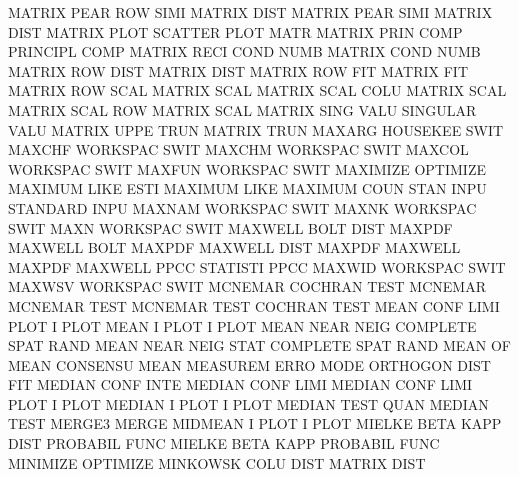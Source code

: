 MATRIX   PEAR ROW  SIMI                 MATRIX   DIST
MATRIX   PEAR SIMI                      MATRIX   DIST
MATRIX   PLOT                           SCATTER  PLOT MATR
MATRIX   PRIN COMP                      PRINCIPL COMP
MATRIX   RECI COND NUMB                 MATRIX   COND NUMB
MATRIX   ROW  DIST                      MATRIX   DIST
MATRIX   ROW  FIT                       MATRIX   FIT
MATRIX   ROW  SCAL                      MATRIX   SCAL
MATRIX   SCAL COLU                      MATRIX   SCAL
MATRIX   SCAL ROW                       MATRIX   SCAL
MATRIX   SING VALU                      SINGULAR VALU
MATRIX   UPPE TRUN                      MATRIX   TRUN
MAXARG                                  HOUSEKEE SWIT
MAXCHF                                  WORKSPAC SWIT
MAXCHM                                  WORKSPAC SWIT
MAXCOL                                  WORKSPAC SWIT
MAXFUN                                  WORKSPAC SWIT
MAXIMIZE                                OPTIMIZE
MAXIMUM  LIKE ESTI                      MAXIMUM  LIKE
MAXIMUM  COUN STAN INPU                 STANDARD INPU
MAXNAM                                  WORKSPAC SWIT
MAXNK                                   WORKSPAC SWIT
MAXN                                    WORKSPAC SWIT
MAXWELL  BOLT DIST                      MAXPDF
MAXWELL  BOLT                           MAXPDF
MAXWELL  DIST                           MAXPDF
MAXWELL                                 MAXPDF
MAXWELL  PPCC                           STATISTI PPCC
MAXWID                                  WORKSPAC SWIT
MAXWSV                                  WORKSPAC SWIT
MCNEMAR                                 COCHRAN  TEST
MCNEMAR                                 MCNEMAR  TEST
MCNEMAR  TEST                           COCHRAN  TEST
MEAN     CONF LIMI PLOT                 I        PLOT
MEAN     I    PLOT                      I        PLOT
MEAN     NEAR NEIG                      COMPLETE SPAT RAND
MEAN     NEAR NEIG STAT                 COMPLETE SPAT RAND
MEAN     OF   MEAN                      CONSENSU MEAN
MEASUREM ERRO MODE                      ORTHOGON DIST FIT
MEDIAN   CONF INTE                      MEDIAN   CONF LIMI
MEDIAN   CONF LIMI PLOT                 I        PLOT
MEDIAN   I    PLOT                      I        PLOT
MEDIAN   TEST QUAN                      MEDIAN   TEST
MERGE3                                  MERGE
MIDMEAN  I    PLOT                      I        PLOT
MIELKE   BETA KAPP DIST                 PROBABIL FUNC
MIELKE   BETA KAPP                      PROBABIL FUNC
MINIMIZE                                OPTIMIZE
MINKOWSK COLU DIST                      MATRIX   DIST
